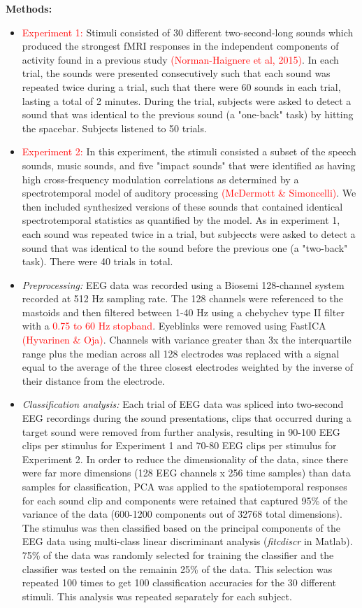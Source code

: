 \documentclass[11pt]{article}
\begin{document}
\textbf{Methods:}
\begin{itemize}
\item \textcolor{red}{Experiment 1:} Stimuli consisted of 30 different two-second-long sounds which produced the strongest fMRI responses in the independent components of activity found in a previous study \textcolor{red}{(Norman-Haignere et al, 2015)}.  In each trial, the sounds were presented consecutively such that each sound was repeated twice during a trial, such that there were 60 sounds in each trial, lasting a total of 2 minutes.  During the trial, subjects were asked to detect a sound that was identical to the previous sound (a "one-back" task) by hitting the spacebar.  Subjects listened to 50 trials.
\item \textcolor{red}{Experiment 2:} In this experiment, the stimuli consisted a subset of the speech sounds, music sounds, and five "impact sounds" that were identified as having high cross-frequency modulation correlations as determined by a spectrotemporal model of auditory processing \textcolor{red}{(McDermott \& Simoncelli)}.  We then included synthesized versions of these sounds that contained identical spectrotemporal statistics as quantified by the model.  As in experiment 1, each sound was repeated twice in a trial, but subjeccts were asked to detect a sound that was identical to the sound before the previous one (a "two-back" task). There were 40 trials in total.
\item \textit{Preprocessing:} EEG data was recorded using a Biosemi 128-channel system recorded at 512 Hz sampling rate.  The 128 channels were referenced to the mastoids and then filtered between 1-40 Hz using a chebychev type II filter with a \textcolor{red}{0.75 to 60 Hz stopband}.  Eyeblinks were removed using FastICA \textcolor{red}{(Hyvarinen \& Oja)}.  Channels with variance greater than 3x the interquartile range plus the median across all 128 electrodes was replaced with a signal equal to the average of the three closest electrodes weighted by the inverse of their distance from the electrode.
\item \textit{Classification analysis:} Each trial of EEG data was spliced into two-second EEG recordings during the sound presentations, clips that occurred during a target sound were removed from further analysis, resulting in 90-100 EEG clips per stimulus for Experiment 1 and 70-80 EEG clips per stimulus for Experiment 2.  In order to reduce the dimensionality of the data, since there were far more dimensions (128 EEG channels x 256 time samples) than data samples for classification, PCA was applied to the spatiotemporal responses for each sound clip and components were retained that captured 95\% of the variance of the data (600-1200 components out of 32768 total dimensions).  The stimulus was then classified based on the principal components of the EEG data using multi-class linear discriminant analysis (\textit{fitcdiscr} in Matlab).  75\% of the data was randomly selected for training the classifier and the classifier was tested on the remainin 25\% of the data.  This selection was repeated 100 times to get 100 classification accuracies for the 30 different stimuli.  This analysis was repeated separately for each subject.  

\end{itemize}
\end{document}
